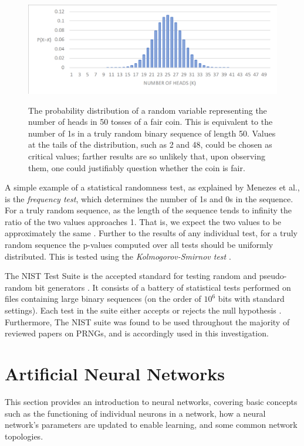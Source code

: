 \documentclass[12pt, titlepage]{report}
\theoremstyle{definition}
\begin{document}
\begin{figure}
    \centering
    \includegraphics[width=1\textwidth]{img/distribution.png}\\
    \caption[Uniform probability distribution]{The probability distribution of a random variable representing the number of heads in 50 tosses of a fair coin. This is equivalent to the number of 1s in a truly random binary sequence of length 50. Values at the tails of the distribution, such as 2 and 48, could be chosen as critical values; farther results are so unlikely that, upon observing them, one could justifiably question whether the coin is fair.}
    \label{figure:distribution}
\end{figure}

A simple example of a statistical randomness test, as explained by Menezes et al., is the \emph{frequency test}, which determines the number of 1s and 0s in the sequence. For a truly random sequence, as the length of the sequence tends to infinity the ratio of the two values approaches 1. That is, we expect the two values to be approximately the same \cite[p. 181]{menezes1996handbook}. Further to the results of any individual test, for a truly random sequence the p-values computed over all tests should be uniformly distributed. This is tested using the \emph{Kolmogorov-Smirnov test} \cite[s. 4-6]{rukhin2001statistical}.

The NIST Test Suite is the accepted standard for testing random and pseudo-random bit generators \cite{lavasani2009practical}. It consists of a battery of statistical tests performed on files containing large binary sequences (on the order of $10^6$ bits with standard settings). Each test in the suite either accepts or rejects the null hypothesis \cite{rukhin2001statistical}. Furthermore,  The NIST suite was found to be used throughout the majority of reviewed papers on PRNGs, and is accordingly used in this investigation.




\section{Artificial Neural Networks}
This section provides an introduction to neural networks, covering basic concepts such as the functioning of individual neurons in a network, how a neural network's parameters are updated to enable learning, and some common network topologies.
\end{document}
